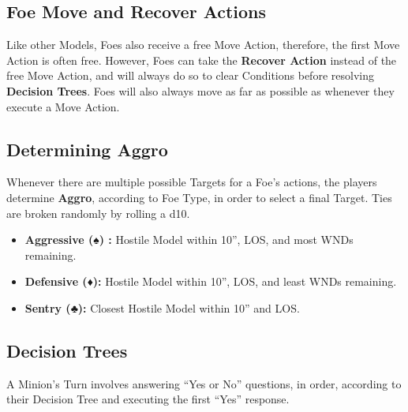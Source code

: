\documentclass[
]{book}
\providecommand{\tightlist}{%
  \setlength{\itemsep}{0pt}\setlength{\parskip}{0pt}}
\begin{document}
\hypertarget{fmove}{%
\subsection*{Foe Move and Recover Actions}\label{fmove}}

Like other Models, Foes also receive a free Move Action, therefore, the first Move Action is often free. However, Foes can take the \textbf{Recover Action} instead of the free Move Action, and will always do so to clear Conditions before resolving \textbf{Decision Trees}. Foes will also always move as far as possible as whenever they execute a Move Action.

\hypertarget{aggro}{%
\subsection*{Determining Aggro}\label{aggro}}

Whenever there are multiple possible Targets for a Foe's actions, the players determine \textbf{Aggro}, according to Foe Type, in order to select a final Target. Ties are broken randomly by rolling a d10.

\begin{itemize}
\tightlist
\item
  \textbf{Aggressive (♠) :} Hostile Model within 10'', LOS, and most WNDs remaining.
\item
  \textbf{Defensive (♦):} Hostile Model within 10'', LOS, and least WNDs remaining.
\item
  \textbf{Sentry (♣):} Closest Hostile Model within 10'' and LOS.
\end{itemize}

\hypertarget{dtrees}{%
\subsection*{Decision Trees}\label{dtrees}}

A Minion's Turn involves answering ``Yes or No'' questions, in order, according to their Decision Tree and executing the first ``Yes'' response.
\end{document}
